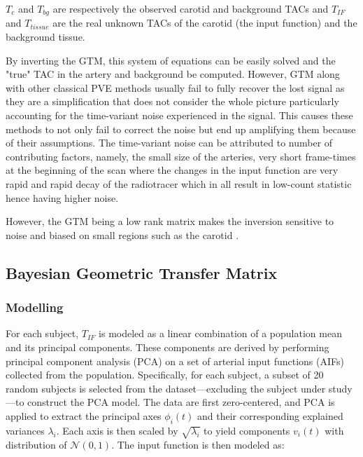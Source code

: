 $T_{c}$ and $T_{bg}$ are respectively the observed carotid and background TACs and $T_{IF}$ and $T_{tissue}$ are the real unknown TACs of the carotid (the input function) and the background tissue.

By inverting the GTM, this system of equations can be easily solved and the "true" TAC in the artery and background be computed.
However, GTM along with other classical PVE methods usually fail to fully recover the lost signal as they are a simplification that does not consider the whole picture particularly accounting for the time-variant noise experienced in the signal.
This causes these methods to not only fail to correct the noise but end up amplifying them because of their assumptions.
The time-variant noise can be attributed to number of contributing factors, namely, the small size of the arteries, very short frame-times at the beginning of the scan where the changes in the input function are very rapid and rapid decay of the radiotracer which in all result in low-count statistic hence having higher noise.

However, the GTM being a low rank matrix makes the inversion sensitive to noise and biased on small regions such as the carotid \cite{zanotti2011image, boellaard2004effects}.

\subsection{Bayesian Geometric Transfer Matrix}
\subsubsection{Modelling}
For each subject, $T_{IF}$ is modeled as a linear combination of a population mean and its principal components.
These components are derived by performing principal component analysis (PCA) on a set of arterial input functions (AIFs) collected from the population.
Specifically, for each subject, a subset of 20 random subjects is selected from the dataset—excluding the subject under study—to construct the PCA model.
The data are first zero-centered, and PCA is applied to extract the principal axes \(\phi_i(t)\) and their corresponding explained variances \(\lambda_i\).
Each axis is then scaled by \(\sqrt{\lambda_i}\) to yield components \(v_i(t)\) with distribution of \(\mathcal{N}(0,1)\). The input function is then modeled as:

